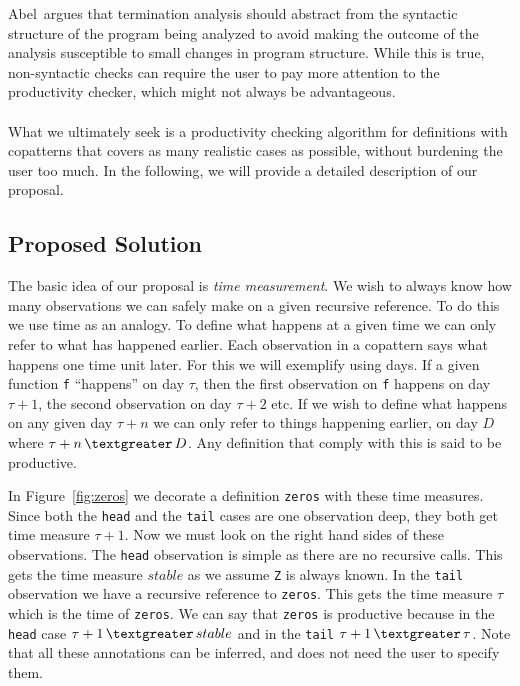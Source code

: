 Abel\,\citep{Abel99terminationchecking} argues that termination analysis should abstract from the syntactic structure of the program being analyzed to avoid making the outcome of the analysis susceptible to small changes in program structure. While this is true, non-syntactic checks can require the user to pay more attention to the productivity checker, which might not always be advantageous. 

\paragraph{}
What we ultimately seek is a productivity checking algorithm for definitions with copatterns that covers as many realistic cases as possible, without burdening the user too much. In the following, we will provide a detailed description of our proposal.
\subsection{Proposed Solution}
The basic idea of our proposal is \textit{time measurement}. We wish to always know how many observations we can safely make on a given recursive reference. To do this we use time as an analogy. To define what happens at a given time we can only refer to what has happened earlier. Each observation in a copattern says what happens one time unit later. For this we will exemplify using days. If a given function \texttt{f} ``happens'' on day $\tau$, then the first observation on \texttt{f} happens on day $\tau+1$, the second observation on day $\tau+2$ etc. If we wish to define what happens on any given day $\tau+n$ we can only refer to things happening earlier, on day $D$ where $\tau+n\, \textgreater \,D$. Any definition that comply with this is said to be productive.

In Figure~\ref{fig:zeros} we decorate a definition \texttt{zeros} with these time measures. Since both the \texttt{head} and the \texttt{tail} cases are one observation deep, they both get time measure $\tau+1$. Now we must look on the right hand sides of these observations. The \texttt{head} observation is simple as there are no recursive calls. This gets the time measure $stable$  as we assume \texttt{Z} is always known. In the \texttt{tail} observation we have a recursive reference to \texttt{zeros}. This gets the time measure $\tau$ which is the time of \texttt{zeros}. We can say that \texttt{zeros} is productive because in the \texttt{head} case $\tau+1\,\textgreater\,stable$ and in the \texttt{tail} $\tau+1\,\textgreater\,\tau$. Note that all these annotations can be inferred, and does not need the user to specify them.

